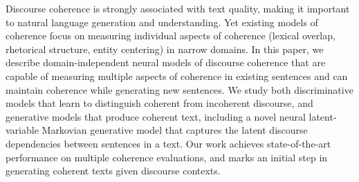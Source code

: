 Discourse coherence is strongly associated with text quality, making it important to natural language generation and understanding. Yet existing models of coherence focus on measuring individual aspects of coherence (lexical overlap, rhetorical structure, entity centering) in narrow domains. In this paper, we describe domain-independent neural models of discourse coherence that are capable of measuring multiple aspects of coherence in existing sentences and can maintain coherence while generating new sentences. We study both discriminative models that learn to distinguish coherent from incoherent discourse, and generative models that produce coherent text, including a novel neural latent-variable Markovian generative model that captures the latent discourse dependencies between sentences in a text. Our work achieves state-of-the-art performance on multiple coherence evaluations, and marks an initial step in generating coherent texts given discourse contexts.
